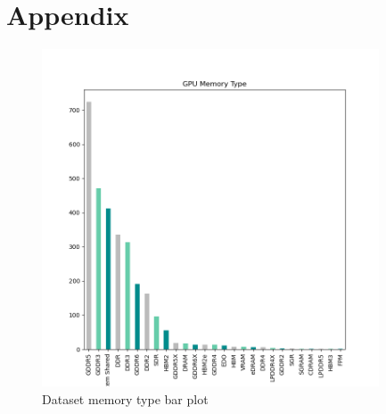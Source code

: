 \documentclass[conference]{IEEEtran}
\begin{document}
	\section*{Appendix}
	\begin{figure}[H]
	\centerline{\includegraphics[width=100mm,scale=1]{DataBarplot.png}}
	\caption{Dataset memory type bar plot}
	\label{DataBarplot}
\end{figure}
\end{document}
